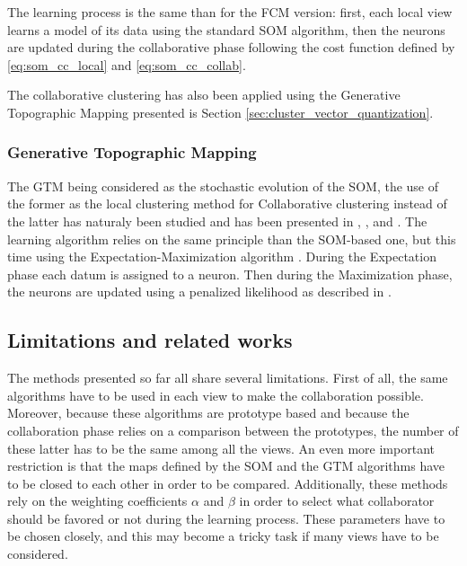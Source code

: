 \documentclass[a4paper]{report}
\begin{document}
    The learning process is the same than for the FCM version: first, each local view learns a model of its data using the standard SOM algorithm, then the neurons are updated during the collaborative phase following the cost function defined by \ref{eq:som_cc_local} and \ref{eq:som_cc_collab}.

    The collaborative clustering has also been applied using the Generative Topographic Mapping \cite{bishop1998gtm} presented is Section \ref{sec:cluster_vector_quantization}.

    \subsubsection{Generative Topographic Mapping}

    The GTM being considered as the stochastic evolution of the SOM, the use of the former as the local clustering method for Collaborative clustering instead of the latter has naturaly been studied and has been presented in \cite{ghassany2012collaborative}, \cite{sublime2015vertical}, \cite{sublime2015horizontal} and \cite{sublime2016collaborative}. The learning algorithm relies on the same principle than the SOM-based one, but this time using the Expectation-Maximization algorithm \cite{dempster1977maximum}. During the Expectation phase each datum is assigned to a neuron. Then during the Maximization phase, the neurons are updated using a penalized likelihood as described in \cite{green1990use}.\\

    \subsection{Limitations and related works}

    The methods presented so far all share several limitations. First of all, the same algorithms have to be used in each view to make the collaboration possible. Moreover, because these algorithms are prototype based and because the collaboration phase relies on a comparison between the prototypes, the number of these latter has to be the same among all the views. An even more important restriction is that the maps defined by the SOM and the GTM algorithms have to be closed to each other in order to be compared. Additionally, these methods rely on the weighting coefficients $\alpha$ and $\beta$ in order to select what collaborator should be favored or not during the learning process. These parameters have to be chosen closely, and this may become a tricky task if many views have to be considered.
\end{document}
